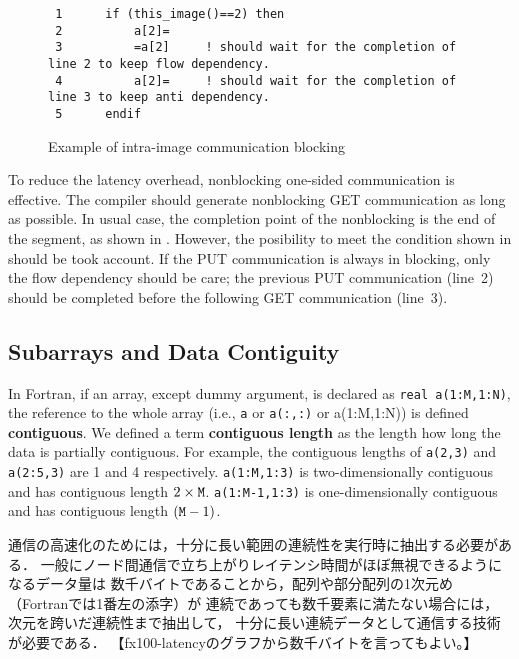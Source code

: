 \begin{figure}[hbt]
 \begin{center}
\begin{verbatim}
 1      if (this_image()==2) then
 2          a[2]=
 3          =a[2]     ! should wait for the completion of line 2 to keep flow dependency.
 4          a[2]=     ! should wait for the completion of line 3 to keep anti dependency.
 5      endif

\end{verbatim}
  \caption{Example of intra-image communication blocking}
  \label{fig:block-ex}
 \end{center}
\end{figure}


\requirement
To reduce the latency overhead, nonblocking one-sided communication is effective.
The compiler should generate nonblocking GET communication as long as possible.
In usual case, the completion point of the nonblocking is the end of the segment, as
shown in .  However, the posibility to meet the condition shown in
 should be took account. If the PUT communication is always in blocking, 
only the flow dependency should be care; the previous PUT communication (line~2) 
should be completed before the following GET communication (line~3).

\subsection{Subarrays and Data Contiguity}

In Fortran, if an array, except dummy argument, is declared as {\tt real a(1:M,1:N)}, 
the reference to the whole array (i.e., {\tt a} or {\tt a(:,:)} or {a(1:M,1:N)})
is defined {\bf contiguous}. 
We defined a term {\bf contiguous length} as the length how long the data is partially
contiguous. For example, the contiguous lengths of {\tt a(2,3)} and {\tt a(2:5,3)} are
1 and 4 respectively.  {\tt a(1:M,1:3)} is two-dimensionally contiguous and has 
contiguous length $2 \times {\tt M}$.
{\tt a(1:M-1,1:3)} is one-dimensionally contiguous and has 
contiguous length $({\tt M} - 1)$.


\requirement
通信の高速化のためには，十分に長い範囲の連続性を実行時に抽出する必要がある．
一般にノード間通信で立ち上がりレイテンシ時間がほぼ無視できるようになるデータ量は
数千バイトであることから，配列や部分配列の1次元め（Fortranでは1番左の添字）が
連続であっても数千要素に満たない場合には，次元を跨いだ連続性まで抽出して，
十分に長い連続データとして通信する技術が必要である．
【fx100-latencyのグラフから数千バイトを言ってもよい。】

